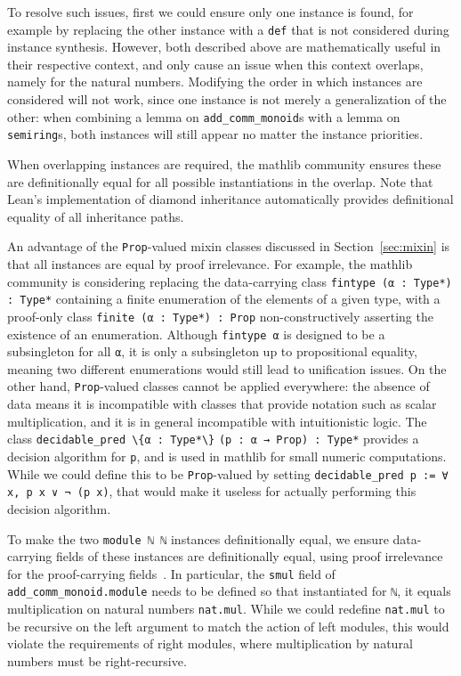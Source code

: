\documentclass[a4paper,UKenglish,cleveref, autoref, thm-restate]{lipics-v2021}
\newcommand{\mathlib}{\textsf{mathlib}\xspace}
\begin{document}
To resolve such issues, first we could ensure only one instance is found,
for example by replacing the other instance with a \lstinline{def} that is not considered during instance synthesis.
However, both described above are mathematically useful in their respective context,
and only cause an issue when this context overlaps, namely for the natural numbers.
Modifying the order in which instances are considered will not work, since one instance is not merely a generalization of the other:
when combining a lemma on \mbox{\lstinline{add_comm_monoid}s} with a lemma on \mbox{\lstinline{semiring}s,} both instances will still appear no matter the instance priorities.

When overlapping instances are required, the \mathlib community ensures these are definitionally equal for all possible instantiations in the overlap.
Note that Lean's implementation of diamond inheritance automatically provides definitional equality of all inheritance paths.

An advantage of the \lstinline{Prop}-valued mixin classes discussed in Section~\ref{sec:mixin} is that all instances are equal by proof irrelevance.
For example, the \mathlib community is considering replacing the data-carrying class \lstinline{fintype (α : Type*) : Type*} containing a finite enumeration of the elements of a given type,
with a proof-only class \lstinline{finite (α : Type*) : Prop} non-constructively asserting the existence of an enumeration.
Although \lstinline{fintype α} %
is designed to be a subsingleton for all \lstinline{α},
it is only a subsingleton up to propositional equality, meaning two different enumerations would still lead to unification issues.
On the other hand, \lstinline{Prop}-valued classes cannot be applied everywhere:
the absence of data means it is incompatible with classes that provide notation such as scalar multiplication,
and it is in general incompatible with intuitionistic logic.
The class \mbox{\lstinline|decidable_pred \{α : Type*\}|} \lstinline|(p : α → Prop) : Type*| provides a decision algorithm for \lstinline{p},
and is used in \mathlib for small numeric computations.
While we could define this to be \lstinline{Prop}-valued by setting \mbox{\lstinline{decidable_pred p := ∀ x, p x ∨ ¬ (p x)}},
that would make it useless for actually performing this decision algorithm.

To make the two \lstinline{module ℕ ℕ} instances definitionally equal,
we ensure data-carrying fields of these instances are definitionally equal, using proof irrelevance for the proof-carrying fields~\cite{mathlib-scalar-actions}.
In particular, the \lstinline{smul} field of \lstinline{add_comm_monoid.module} needs to be defined
so that instantiated for \lstinline{ℕ}, it equals multiplication on natural numbers \lstinline{nat.mul}.
While we could redefine \lstinline{nat.mul} to be recursive on the left argument to match the action of left modules,
this would violate the requirements of right modules, where multiplication by natural numbers must be right-recursive.
\end{document}
